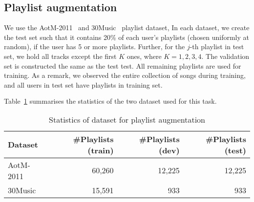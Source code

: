 %


\subsection{Playlist augmentation}
\label{ssec:pla}

We use the AotM-2011~\cite{mcfee2012hypergraph} and 30Music~\cite{30music2015} playlist dataset,
In each dataset, we create the test set such that it contains 20\% of each user's playlists (chosen uniformly at random),
if the user has 5 or more playlists. Further, for the $j$-th playlist in test set, we hold all tracks except the first $K$ ones, where $K=1,2,3,4$.
The validation set is constructed the same as the test test.
All remaining playlists are used for training.
As a remark, we observed the entire collection of songs during training, 
and all users in test set have playlists in training set.

Table~\ref{tab:stats_pla} summarises the statistics of the two dataset used for this task.

\begin{table}[!h]
\centering
\caption{Statistics of dataset for playlist augmentation}
\label{tab:stats_pla}
\small
\begin{tabular}{l|rrr}
\toprule
Dataset   & \#Playlists (train) & \#Playlists (dev) & \#Playlists (test) \\ %
\midrule
AotM-2011 & 60,260              & 12,225            & 12,225             \\ %
30Music   & 15,591              & 933               & 933                \\ %
\bottomrule
\end{tabular}
\end{table}

%
